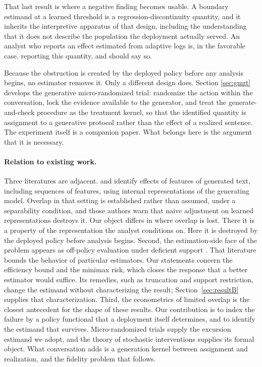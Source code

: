 \documentclass[11pt]{article}
\theoremstyle{definition}
\theoremstyle{remark}
\begin{document}
That last result is where a negative finding becomes usable. A boundary
estimand at a learned threshold is a regression-discontinuity quantity, and
it inherits the interpretive apparatus of that design, including the
understanding that it does not describe the population the deployment
actually served. An analyst who reports an effect estimated from adaptive
logs is, in the favorable case, reporting this quantity, and should say so.

Because the obstruction is created by the deployed policy before any analysis
begins, no estimator removes it. Only a different design does. Section
\ref{sec:gmrt} develops the generative micro-randomized trial: randomize the
action within the conversation, lock the evidence available to the generator,
and treat the generate-and-check procedure as the treatment kernel, so that
the identified quantity is assignment to a generative protocol rather than
the effect of a realized sentence. The experiment itself is a companion
paper. What belongs here is the argument that it is necessary.

\paragraph{Relation to existing work.} Three literatures are adjacent.
\citet{imai2026causal} and \citet{nakamura2026dynamic} identify effects of
features of generated text, including sequences of features, using internal
representations of the generating model. Overlap in that setting is
established rather than assumed, under a separability condition, and those
authors warn that naive adjustment on learned representations destroys it.
Our object differs in where overlap is lost. There it is a property of the
representation the analyst conditions on. Here it is destroyed by the
deployed policy before analysis begins. Second, the estimation-side face of
the problem appears as off-policy evaluation under deficient support
\citep{sachdeva2020off,dudik2011doubly,thomas2016data,jiang2016doubly,
kallus2020double}. That literature bounds the behavior of particular
estimators. Our statements concern the efficiency bound and the minimax risk,
which closes the response that a better estimator would suffice. Its
remedies, such as truncation and support restriction, change the estimand
without characterizing the result; Section~\ref{sec:resultB} supplies that
characterization. Third, the econometrics of limited overlap
\citep{khan2010irregular,damour2021overlap,li2018balancing} is the closest
antecedent for the shape of these results. Our contribution is to index the
failure by a policy functional that a deployment itself determines, and to
identify the estimand that survives. Micro-randomized trials
\citep{qian2022microrandomized,boruvka2018assessing} supply the excursion
estimand we adopt, and the theory of stochastic interventions
\citep{munoz2012population,kennedy2019nonparametric,young2014identification}
supplies its formal object. What conversation adds is a generation kernel
between assignment and realization, and the fidelity problem that follows.
\end{document}
